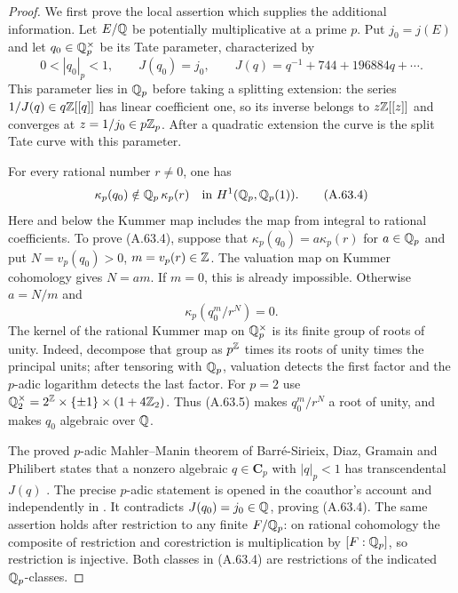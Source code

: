 \begin{proof}
We first prove the local assertion which supplies the additional
information.  Let $E/\mathbb Q$ be potentially multiplicative at a prime
$p$.  Put $j_0=j(E)$ and let $q_0\in\mathbb Q_p^\times$ be its Tate
parameter, characterized by
\[
              0<|q_0|_p<1,\qquad J(q_0)=j_0,
       \qquad J(q)=q^{-1}+744+196884q+\cdots.
\tag{A.63.3}
\]
This parameter lies in $\mathbb Q_p$ before taking a splitting extension:
the series $1/J(q)\in q\mathbb Z[[q]]$ has linear coefficient one, so
its inverse belongs to $z\mathbb Z[[z]]$ and converges at
$z=1/j_0\in p\mathbb Z_p$.  After a quadratic extension the curve is
the split Tate curve with this parameter.

For every rational number $r\ne0$, one has
\[
                 \kappa_p(q_0)\notin
                 \mathbb Q_p\,\kappa_p(r)
               \quad\hbox{in }H^1(\mathbb Q_p,\mathbb Q_p(1)).
\tag{A.63.4}
\]
Here and below the Kummer map includes the map from integral to
rational coefficients.  To prove (A.63.4), suppose that
$\kappa_p(q_0)=a\kappa_p(r)$ for $a\in\mathbb Q_p$ and put
$N=v_p(q_0)>0$, $m=v_p(r)\in\mathbb Z$.
The valuation map on Kummer cohomology gives $N=am$.
If $m=0$, this is already impossible.  Otherwise $a=N/m$ and
\[
                       \kappa_p(q_0^m/r^N)=0.
\tag{A.63.5}
\]
The kernel of the rational Kummer map on $\mathbb Q_p^\times$ is its
finite group of roots of unity.  Indeed, decompose that group as
$p^\mathbb Z$ times its roots of unity times the principal units; after
tensoring with $\mathbb Q_p$, valuation detects the first factor and
the $p$-adic logarithm detects the last factor.  For $p=2$ use
$\mathbb Q_2^\times=2^\mathbb Z\times\{\pm1\}\times(1+4\mathbb Z_2)$.
Thus (A.63.5) makes $q_0^m/r^N$ a root of unity, and makes
$q_0$ algebraic over $\mathbb Q$.

The proved $p$-adic Mahler--Manin theorem of
Barr\'e-Sirieix, Diaz, Gramain and Philibert states that a
nonzero algebraic $q\in\mathbf C_p$ with $|q|_p<1$ has
transcendental $J(q)$
\cite{LegBDGP1996,LegGramain1999,LegGraftieaux2005}.
The precise $p$-adic statement is opened in the coauthor's
account \cite[pp.~73--74]{LegGramain1999} and independently in
\cite[p.~180]{LegGraftieaux2005}.
It contradicts $J(q_0)=j_0\in\mathbb Q$, proving (A.63.4).
The same assertion holds after restriction to any finite
$F/\mathbb Q_p$: on rational cohomology the composite of restriction
and corestriction is multiplication by $[F:\mathbb Q_p]$, so
restriction is injective.  Both classes in (A.63.4) are
restrictions of the indicated $\mathbb Q_p$-classes.


\end{proof}
